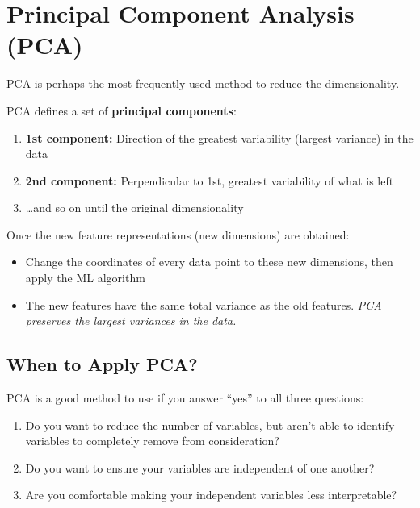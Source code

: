 \documentclass[11pt,a4paper]{article}
\theoremstyle{definition}
\theoremstyle{plain}
\theoremstyle{remark}
\begin{document}

\section{Principal Component Analysis (PCA)}

PCA is perhaps the most frequently used method to reduce the dimensionality.

\begin{tcolorbox}[colback=green!5!white,colframe=green!75!black,title=\textbf{PCA --- Core Idea}]
PCA defines a set of \textbf{principal components}:
\begin{enumerate}
    \item \textbf{1st component:} Direction of the greatest variability (largest variance) in the data
    \item \textbf{2nd component:} Perpendicular to 1st, greatest variability of what is left
    \item \ldots and so on until the original dimensionality
\end{enumerate}
Once the new feature representations (new dimensions) are obtained:
\begin{itemize}
    \item Change the coordinates of every data point to these new dimensions, then apply the ML algorithm
    \item The new features have the same total variance as the old features. \textit{PCA preserves the largest variances in the data.}
\end{itemize}
\end{tcolorbox}

\subsection{When to Apply PCA?}

PCA is a good method to use if you answer ``yes'' to all three questions:
\begin{enumerate}
    \item Do you want to reduce the number of variables, but aren't able to identify variables to completely remove from consideration?
    \item Do you want to ensure your variables are independent of one another?
    \item Are you comfortable making your independent variables less interpretable?
\end{enumerate}
\end{document}
